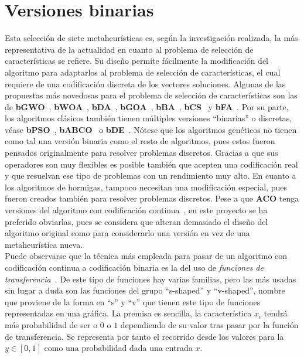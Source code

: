 \section{Versiones binarias}
Esta selección de siete metaheurísticas es, según la investigación realizada, la más representativa de la actualidad en cuanto al problema de selección de características se refiere. Su diseño permite fácilmente la modificación del algoritmo para adaptarlos al problema de selección de características, el cual requiere de una codificación discreta de los vectores soluciones. Algunas de las propuestas más novedosas para el problema de selección de características son las de \textbf{bGWO}~\cite{emary_binary_2016, Al-Tashi201939496, Hu2020}, \textbf{bWOA}~\cite{hussien_s-shaped_2019, mafarja_whale_2018}, \textbf{bDA}~\cite{mafarja_binary_2018, Hammouri2020, Mafarja201712, Sayed2019188}, \textbf{bGOA}~\cite{mafarja_binary_2019, Aljarah2018478, Mafarja201825}, \textbf{bBA}~\cite{mirjalili_binary_2014, Nakamura2012291, Rodrigues20142250}, \textbf{bCS}~\cite{rodrigues_bcs_2013} y \textbf{bFA}~\cite{zhang2016optimal, Zhang2017561, Selvakumar2019148, Hu201517}. Por su parte, los algoritmos clásicos también tienen múltiples versiones ``binarias'' o discretas, véase \textbf{bPSO}~\cite{mirjalili_s-shaped_2013, Lin20081817, Xue20131656, Wang2007459}, \textbf{bABCO}~\cite{kiran_binary_2021, Rao2019634, Zorarpaci201691, Hancer2018462} o \textbf{bDE}~\cite{pampara_binary_2006, Zorarpaci201691, Zhang202067, Hancer2018103}. Nótese que los algoritmos genéticos no tienen como tal una versión binaria como el resto de algoritmos, pues estos fueron pensados originalmente para resolver problemas discretos. Gracias a que sus operadores son muy flexibles es posible también que acepten una codificación real y que resuelvan ese tipo de problemas con un rendimiento muy alto. En cuanto a los algoritmos de hormigas, tampoco necesitan una modificación especial, pues fueron creados también para resolver problemas discretos. Pese a que \textbf{ACO} tenga versiones del algoritmo con codificación continua~\cite{socha_aco_2004}, en este proyecto se ha preferido obviarlas, pues se considera que alteran demasiado el diseño del algoritmo original como para considerarlo una versión en vez de una metaheurística nueva.\\[6pt]
Puede observarse que la técnica más empleada para pasar de un algoritmo con codificación continua a codificación binaria es la del uso de \textit{funciones de transferencia}~\cite{he_novel_2022, mirjalili_s-shaped_2013, dokeroglu_comprehensive_2022}. De este tipo de funciones hay varias familias, pero las más usadas sin lugar a duda son las funciones del grupo ``s-shaped'' y ``v-shaped'', nombre que proviene de la forma en ``s'' y ``v'' que tienen este tipo de funciones representadas en una gráfica. La premisa es sencilla, la característica $x_i$ tendrá más probabilidad de ser o $0$ o $1$ dependiendo de su valor tras pasar por la función de transferencia. Se representa por tanto el recorrido desde los valores para la $y\in[0,1]$ como una probabilidad dada una entrada $x$.


